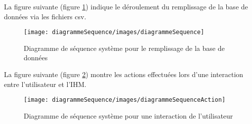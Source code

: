 La figure suivante (figure \ref{diagramme_sequence}) indique le déroulement du remplissage de la base de données via les fichiers csv.

\begin{figure}[H]
	\centering
	\texttt{[image: diagrammeSequence/images/diagrammeSequence]}
	\caption{Diagramme de séquence système pour le remplissage de la base de données}	
	\label{diagramme_sequence}
\end{figure}
	
La figure suivante (figure \ref{diagramme_sequence_2}) montre les actions effectuées lors d'une interaction entre l'utilisateur et l'IHM.

\begin{figure}[H]
	\centering
	\texttt{[image: diagrammeSequence/images/diagrammeSequenceAction]}
	\caption{Diagramme de séquence système pour une interaction de l'utilisateur}
	\label{diagramme_sequence_2}
\end{figure}